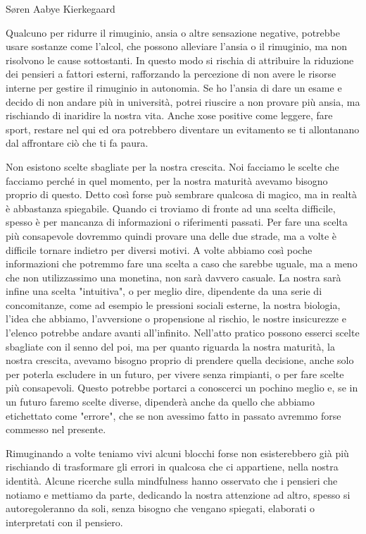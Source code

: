 \documentclass[12pt]{book} %
\begin{document}
Søren Aabye Kierkegaard

Qualcuno per ridurre il rimuginio, ansia o altre sensazione negative, potrebbe usare sostanze come l'alcol, che possono alleviare l’ansia o il rimuginio, ma non risolvono le cause sottostanti.
In questo modo si rischia di attribuire la riduzione dei pensieri a fattori esterni,  rafforzando la percezione di non avere le risorse interne per gestire il rimuginio in autonomia. Se ho l'ansia di dare un esame e decido di non andare più in università, potrei riuscire a non provare più ansia, ma rischiando di inaridire la nostra vita. 
Anche xose positive come leggere, fare sport, restare nel qui ed ora potrebbero diventare un evitamento se ti allontanano dal affrontare ciò che ti fa paura. 

Non esistono scelte sbagliate per la nostra crescita. Noi facciamo le scelte che facciamo perché in quel momento, per la nostra maturità avevamo bisogno proprio di questo. 
Detto così forse può sembrare qualcosa di magico, ma in realtà è abbastanza spiegabile. Quando ci troviamo di fronte ad una scelta difficile, spesso è per mancanza di informazioni o riferimenti passati. Per fare una scelta più consapevole dovremmo quindi provare una delle due strade, ma a volte è difficile tornare indietro per diversi motivi. A volte abbiamo così poche informazioni che potremmo fare una scelta a caso che sarebbe uguale, ma a meno che non utilizzassimo una monetina, non sarà davvero casuale. La nostra sarà infine una scelta "intuitiva", o per meglio dire, dipendente da una serie di concomitanze, come ad esempio le pressioni sociali esterne, la nostra biologia, l'idea che abbiamo, l'avversione o propensione al rischio, le nostre insicurezze e l'elenco potrebbe andare avanti all'infinito. Nell'atto pratico possono esserci scelte sbagliate con il senno del poi, ma per quanto riguarda la nostra maturità, la nostra crescita, avevamo bisogno proprio di prendere quella decisione, anche solo per poterla escludere in un futuro, per vivere senza rimpianti, o per fare scelte più consapevoli. Questo potrebbe portarci a conoscerci un pochino meglio e, se in un futuro faremo scelte diverse, dipenderà anche da quello che abbiamo etichettato come "errore", che se non avessimo fatto in passato avremmo forse commesso nel presente.

Rimuginando a volte teniamo vivi alcuni blocchi forse non esisterebbero già più rischiando di trasformare gli errori in qualcosa che ci appartiene, nella nostra identità.
Alcune ricerche sulla mindfulness hanno osservato che i pensieri che notiamo e mettiamo da parte, dedicando la nostra attenzione ad altro, spesso si autoregoleranno da soli, senza bisogno che vengano spiegati, elaborati o interpretati con il pensiero.
\end{document}
